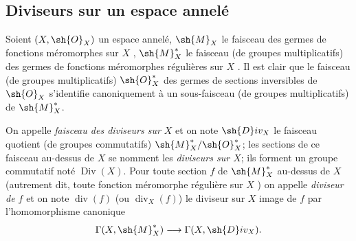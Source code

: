 \subsection{Diviseurs sur un espace annelé}
\label{IV.21.1}

\begin{env}[21.1.1]
\label{IV.21.1.1}
Soient $(X,\sh{O}_X)$ un espace annelé, $\sh{M}_X$ le faisceau des germes de fonctions méromorphes sur $X$ , $\sh{M}_X^*$ le faisceau (de groupes multiplicatifs) des germes de fonctions méromorphes régulières sur $X$ .
Il est clair que le faisceau (de groupes multiplicatifs) $\sh{O}_X^*$ des germes de sections inversibles de $\sh{O}_X$ s'identifie canoniquement à un sous-faisceau (de groupes multiplicatifs) de $\sh{M}_X^*$.
\end{env}

\begin{definition}[21.1.2]
On appelle \emph{faisceau des diviseurs sur $X$} et on note $\sh{D}iv_X$ le faisceau quotient (de groupes commutatifs) $\sh{M}_X^*/\sh{O}_X^*$;
les sections de ce faisceau au-dessus de $X$ se nomment les \emph{diviseurs sur $X$}; ils forment un groupe commutatif noté $\operatorname{Div}(X)$.
Pour toute section $f$ de $\sh{M}_X^*$ au-dessus de $X$ (autrement dit, toute fonction méromorphe régulière sur $X$ ) on appelle \emph{diviseur de $f$} et on note $\operatorname{div}(f)$ (ou $\operatorname{div}_X(f)$) le diviseur sur $X$ image de $f$ par l'homomorphisme canonique
\[
  \Gamma(X,\sh{M}_X^*)\longrightarrow\Gamma(X,\sh{D}iv_X).
\]
\end{definition}

